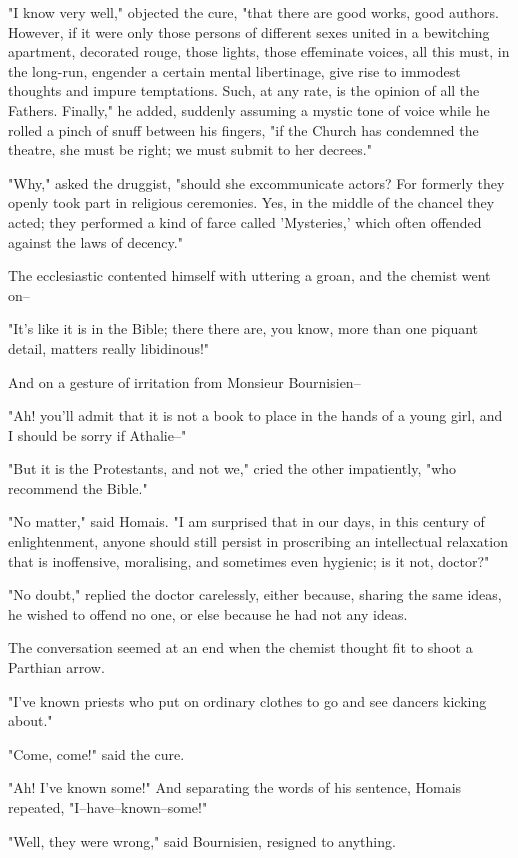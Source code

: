 \documentclass{tufte-book}
\begin{document}
"I know very well," objected the cure, "that there are good works,
good authors. However, if it were only those persons of different sexes
united in a bewitching apartment, decorated rouge, those lights, those
effeminate voices, all this must, in the long-run, engender a
certain mental libertinage, give rise to immodest thoughts and impure
temptations. Such, at any rate, is the opinion of all the Fathers.
Finally," he added, suddenly assuming a mystic tone of voice while
he rolled a pinch of snuff between his fingers, "if the Church has
condemned the theatre, she must be right; we must submit to her
decrees."

"Why," asked the druggist, "should she excommunicate actors? For
formerly they openly took part in religious ceremonies. Yes, in the
middle of the chancel they acted; they performed a kind of farce called
'Mysteries,' which often offended against the laws of decency."

The ecclesiastic contented himself with uttering a groan, and the
chemist went on--

"It's like it is in the Bible; there there are, you know, more than one
piquant detail, matters really libidinous!"

And on a gesture of irritation from Monsieur Bournisien--

"Ah! you'll admit that it is not a book to place in the hands of a young
girl, and I should be sorry if Athalie--"

"But it is the Protestants, and not we," cried the other impatiently,
"who recommend the Bible."

"No matter," said Homais. "I am surprised that in our days, in this
century of enlightenment, anyone should still persist in proscribing an
intellectual relaxation that is inoffensive, moralising, and sometimes
even hygienic; is it not, doctor?"

"No doubt," replied the doctor carelessly, either because, sharing the
same ideas, he wished to offend no one, or else because he had not any
ideas.

The conversation seemed at an end when the chemist thought fit to shoot
a Parthian arrow.

"I've known priests who put on ordinary clothes to go and see dancers
kicking about."

"Come, come!" said the cure.

"Ah! I've known some!" And separating the words of his sentence, Homais
repeated, "I--have--known--some!"

"Well, they were wrong," said Bournisien, resigned to anything.
\end{document}
